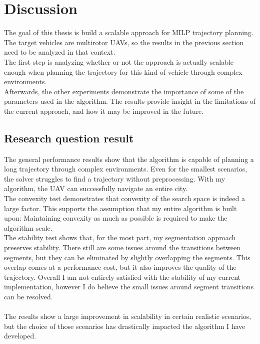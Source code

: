\section{Discussion}
The goal of this thesis is build a scalable approach for MILP trajectory planning. The target vehicles are multirotor UAVs, so the results in the previous section need to be analyzed in that context. \\
The first step is analyzing whether or not the approach is actually scalable enough when planning the trajectory for this kind of vehicle through complex environments.\\
Afterwards, the other experiments demonstrate the importance of some of the parameters used in the algorithm. The results provide insight in the limitations of the current approach, and how it may be improved in the future.

\subsection{Research question result}


The general performance results show that the algorithm is capable of planning a long trajectory through complex environments. Even for the smallest scenarios, the solver struggles to find a trajectory without preprocessing. With my algorithm, the UAV can successfully navigate an entire city. \\
The convexity test demonstrates that convexity of the search space is indeed a large factor. This supports the assumption that my entire algorithm is built upon: Maintaining convexity as much as possible is required to make the algorithm scale. \\
The stability test shows that, for the most part, my segmentation approach preserves stability. There still are some issues around the transitions between segments, but they can be eliminated by slightly overlapping the segments. This overlap comes at a performance cost, but it also improves the quality of the trajectory. Overall I am not entirely satisfied with the stability of my current implementation, however I do believe the small issues around segment transitions can be resolved. \\\\

The results show a large improvement in scalability in certain realistic scenarios, but the choice of those scenarios has drastically impacted the algorithm I have developed.\\

